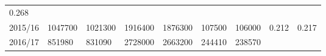 \documentclass[
  spanish,
]{article}
\begin{document}
\begin{longtable}[]{@{}lllllllll@{}}
\begin{minipage}[t]{0.09\columnwidth}
0.268\strut
\end{minipage}\tabularnewline
\begin{minipage}[t]{0.06\columnwidth}\raggedright
2015/16\strut
\end{minipage} & \begin{minipage}[t]{0.09\columnwidth}\raggedright
1047700\strut
\end{minipage} & \begin{minipage}[t]{0.10\columnwidth}\raggedright
1021300\strut
\end{minipage} & \begin{minipage}[t]{0.09\columnwidth}\raggedright
1916400\strut
\end{minipage} & \begin{minipage}[t]{0.10\columnwidth}\raggedright
1876300\strut
\end{minipage} & \begin{minipage}[t]{0.08\columnwidth}\raggedright
107500\strut
\end{minipage} & \begin{minipage}[t]{0.09\columnwidth}\raggedright
106000\strut
\end{minipage} & \begin{minipage}[t]{0.08\columnwidth}\raggedright
0.212\strut
\end{minipage} & \begin{minipage}[t]{0.09\columnwidth}\raggedright
0.217\strut
\end{minipage}\tabularnewline
\begin{minipage}[t]{0.06\columnwidth}\raggedright
2016/17\strut
\end{minipage} & \begin{minipage}[t]{0.09\columnwidth}\raggedright
851980\strut
\end{minipage} & \begin{minipage}[t]{0.10\columnwidth}\raggedright
831090\strut
\end{minipage} & \begin{minipage}[t]{0.09\columnwidth}\raggedright
2728000\strut
\end{minipage} & \begin{minipage}[t]{0.10\columnwidth}\raggedright
2663200\strut
\end{minipage} & \begin{minipage}[t]{0.08\columnwidth}\raggedright
244410\strut
\end{minipage} & \begin{minipage}[t]{0.09\columnwidth}\raggedright
238570\strut

\end{minipage}
\end{longtable}
\end{document}
